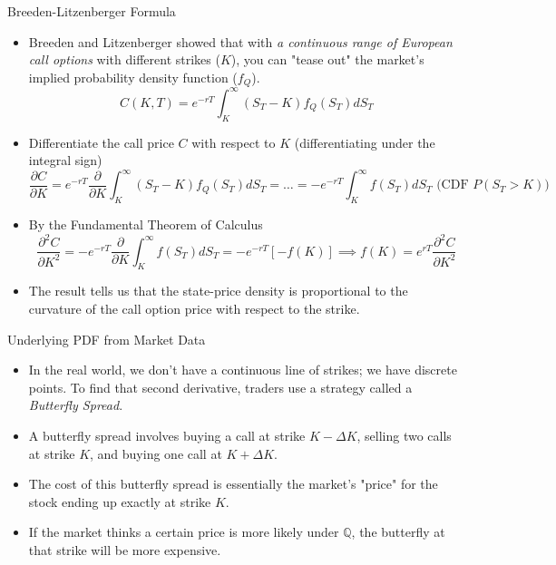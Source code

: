 \documentclass{beamer}
\begin{document}
	\begin{frame}{Breeden-Litzenberger Formula}
	\begin{itemize}
		\item Breeden and Litzenberger showed that with \emph{a continuous range of European call options} with different strikes ($K$), you can "tease out" the market's implied probability density function ($f_Q$).
		\begin{equation*}
		C(K,T)=e^{-rT}\int_K^{\infty}(S_T-K)f_Q(S_T)dS_T
		\end{equation*}
		\item Differentiate the call price $C$ with respect to $K$ (differentiating under the integral sign)
		\begin{equation*}
		\frac{\partial C}{\partial K}=e^{-rT}\frac{\partial}{\partial K} \int_K^{\infty}(S_T-K)f_Q(S_T)dS_T = \ldots = - e^{-rT}\int_K^{\infty}f(S_T)dS_T\,\,\text{(CDF } P(S_T > K))
		\end{equation*}
		\item By the Fundamental Theorem of Calculus
		\begin{equation}
			\frac{\partial^2 C}{\partial K^2}=-e^{-rT}\frac{\partial}{\partial K}\int_K^{\infty}f(S_T)dS_T = -e^{-rT}[-f(K)] \implies f(K)=e^{rT}\frac{\partial^2 C}{\partial K^2}
		\end{equation}
		\item The result tells us that the state-price density is proportional to the curvature of the call option price with respect to the strike.
	\end{itemize}
	\end{frame}

	\begin{frame}{Underlying PDF from Market Data}
		\begin{itemize}
			\item In the real world, we don't have a continuous line of strikes; we have discrete points. To find that second derivative, traders use a strategy called a \emph{Butterfly Spread}.
			\item A butterfly spread involves buying a call at strike $K-\Delta K$, selling two calls at strike $K$, and buying one call at $K+\Delta K$.
			\item The cost of this butterfly spread is essentially the market's "price" for the stock ending up exactly at strike $K$.
			\item If the market thinks a certain price is more likely under $\mathbb{Q}$, the butterfly at that strike will be more expensive.
		\end{itemize}
	\end{frame}
\end{document}
